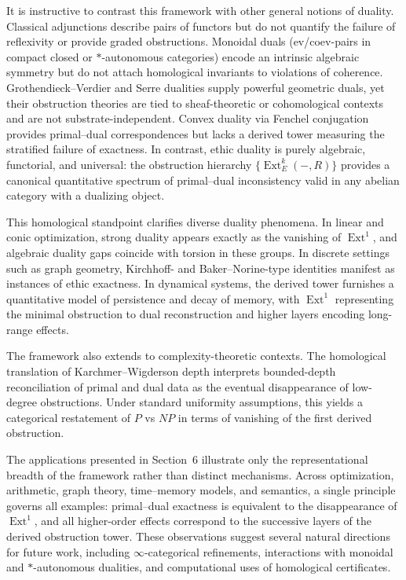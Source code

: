 \documentclass[12pt]{article}
\theoremstyle{plain}
\theoremstyle{definition}
\theoremstyle{remark}
\numberwithin{equation}{section}
\begin{document}
It is instructive to contrast this framework with other general notions of
duality. Classical adjunctions describe pairs of functors but do not quantify
the failure of reflexivity or provide graded obstructions. Monoidal duals
(ev/coev-pairs in compact closed or $*$-autonomous categories) encode an intrinsic
algebraic symmetry but do not attach homological invariants to violations of
coherence. Grothendieck--Verdier and Serre dualities supply powerful geometric
duals, yet their obstruction theories are tied to sheaf-theoretic or cohomological
contexts and are not substrate-independent. Convex duality via Fenchel
conjugation provides primal--dual correspondences but lacks a derived tower
measuring the stratified failure of exactness. In contrast, ethic duality is
purely algebraic, functorial, and universal: the obstruction hierarchy
$\{\operatorname{Ext}^k_E(-,R)\}$ provides a canonical quantitative spectrum of
primal--dual inconsistency valid in any abelian category with a dualizing object.

This homological standpoint clarifies diverse duality phenomena. In linear and
conic optimization, strong duality appears exactly as the vanishing of
$\operatorname{Ext}^1$, and algebraic duality gaps coincide with torsion in these
groups. In discrete settings such as graph geometry, Kirchhoff- and
Baker--Norine-type identities manifest as instances of ethic exactness. In
dynamical systems, the derived tower furnishes a quantitative model of persistence
and decay of memory, with $\operatorname{Ext}^1$ representing the minimal
obstruction to dual reconstruction and higher layers encoding long-range effects.

The framework also extends to complexity-theoretic contexts. The homological
translation of Karchmer--Wigderson depth interprets bounded-depth reconciliation of
primal and dual data as the eventual disappearance of low-degree obstructions. Under
standard uniformity assumptions, this yields a categorical restatement of $P$ vs
$NP$ in terms of vanishing of the first derived obstruction.

The applications presented in Section~6 illustrate only the representational
breadth of the framework rather than distinct mechanisms. Across optimization,
arithmetic, graph theory, time--memory models, and semantics, a single principle
governs all examples: primal--dual exactness is equivalent to the disappearance of
$\operatorname{Ext}^1$, and all higher-order effects correspond to the successive
layers of the derived obstruction tower. These observations suggest several natural
directions for future work, including $\infty$-categorical refinements, interactions
with monoidal and $*$-autonomous dualities, and computational uses of homological
certificates.
\end{document}
